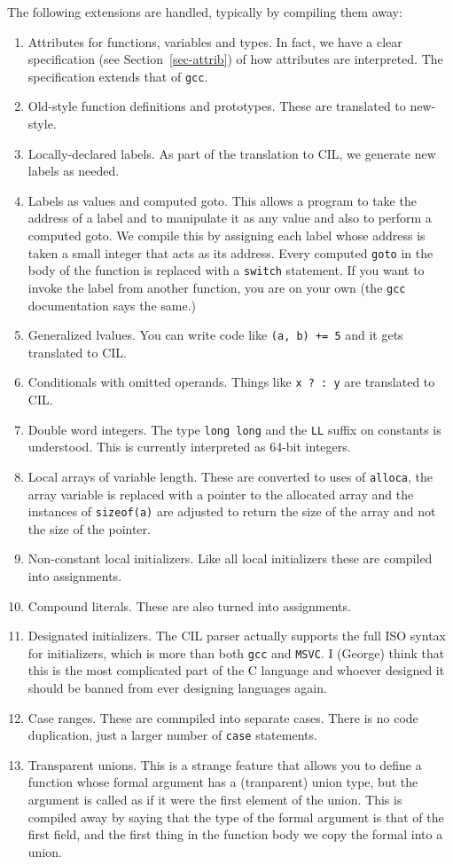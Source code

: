 \documentclass{article}
\def\secref#1{Section~\ref{sec-#1}}
\def\t#1{{\tt #1}}
\begin{document}
 The following extensions are handled, typically by compiling them away:
\begin{enumerate}
\item Attributes for functions, variables and types. In fact, we have a clear
specification (see \secref{attrib}) of how attributes are interpreted. The
specification extends that of \t{gcc}.
\item Old-style function definitions and prototypes. These are translated to
new-style. 
\item Locally-declared labels. As part of the translation to CIL, we generate
new labels as needed. 
\item Labels as values and computed goto. This allows a program to take the
address of a label and to manipulate it as any value and also to perform a
computed goto. We compile this by assigning each label whose address is taken
a small integer that acts as its address. Every computed \t{goto} in the body
of the function is replaced with a \t{switch} statement. If you want to invoke
the label from another function, you are on your own (the \t{gcc}
documentation says the same.)
\item Generalized lvalues. You can write code like \t{(a, b) += 5} and it gets
translated to CIL. 
\item Conditionals with omitted operands. Things like \t{x ? : y} are
translated to CIL.
\item Double word integers. The type \t{long long} and the \t{LL} suffix on
constants is understood. This is currently interpreted as 64-bit integers.
\item Local arrays of variable length. These are converted to uses of
\t{alloca}, the array variable is replaced with a pointer to the allocated
array and the instances of \t{sizeof(a)} are adjusted to return the size of
the array and not the size of the pointer. 
\item Non-constant local initializers. Like all local initializers these are
compiled into assignments. 
\item Compound literals. These are also turned into assignments.
\item Designated initializers. The CIL parser actually supports the full ISO
syntax for initializers, which is more than both \t{gcc} and \t{MSVC}. I
(George) think that this is the most complicated part of the C language and
whoever designed it should be banned from ever designing languages again.
\item Case ranges. These are commpiled into separate cases. There is no code
duplication, just a larger number of \t{case} statements.
\item Transparent unions. This is a strange feature that allows you to define
a function whose formal argument has a (tranparent) union type, but the
argument is called as if it were the first element of the union. This is
compiled away by saying that the type of the formal argument is that of the
first field, and the first thing in the function body we copy the formal into
a union. 


\end{enumerate}
\end{document}
